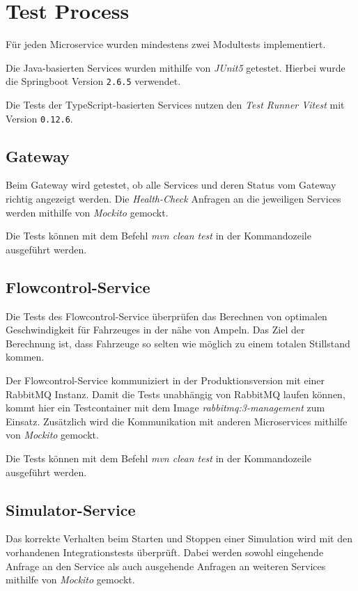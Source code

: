 \section{Test Process}

Für jeden Microservice wurden mindestens zwei Modultests implementiert.

Die Java-basierten Services wurden mithilfe von \textit{JUnit5} getestet.
Hierbei wurde die Springboot Version \verb|2.6.5| verwendet.

Die Tests der TypeScript-basierten Services nutzen den \textit{Test Runner Vitest}  mit Version \verb|0.12.6|.

\subsection{Gateway}

Beim Gateway wird getestet, ob alle Services und deren Status vom Gateway richtig angezeigt werden.
Die \textit{Health-Check} Anfragen an die jeweiligen Services werden mithilfe von \textit{Mockito} gemockt. 

Die Tests können mit dem Befehl \textit{mvn clean test} in der Kommandozeile ausgeführt werden.

\subsection{Flowcontrol-Service}

Die Tests des Flowcontrol-Service überprüfen das Berechnen von optimalen Geschwindigkeit für Fahrzeuges in der nähe von Ampeln.
Das Ziel der Berechnung ist, dass Fahrzeuge so selten wie möglich zu einem totalen Stillstand kommen.

Der Flowcontrol-Service kommuniziert in der Produktionsversion mit einer RabbitMQ Instanz.
Damit die Tests unabhängig von RabbitMQ laufen können, kommt hier ein Testcontainer mit dem Image \textit{rabbitmq:3-management} zum Einsatz.
Zusätzlich wird die Kommunikation mit anderen Microservices mithilfe von \textit{Mockito} gemockt.

Die Tests können mit dem Befehl \textit{mvn clean test} in der Kommandozeile ausgeführt werden. 

\subsection{Simulator-Service}

Das korrekte Verhalten beim Starten und Stoppen einer Simulation wird mit den vorhandenen Integrationstests überprüft.
Dabei werden sowohl eingehende Anfrage an den Service als auch ausgehende Anfragen an weiteren Services mithilfe von \textit{Mockito} gemockt.

